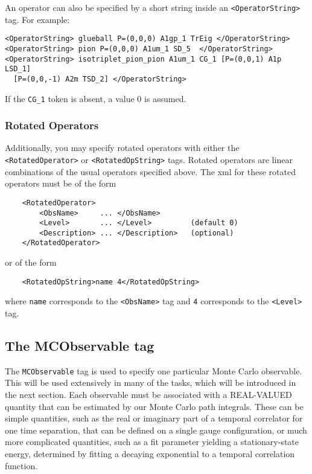 \documentclass[12pt]{article}
\newcommand{\vb}{\texttt}
\begin{document}
An operator can also be specified by a short string inside an 
\vb{<OperatorString>} tag.  For example:                                                       
\begin{verbatim}
<OperatorString> glueball P=(0,0,0) A1gp_1 TrEig </OperatorString>                        
<OperatorString> pion P=(0,0,0) A1um_1 SD_5  </OperatorString>                            
<OperatorString> isotriplet_pion_pion A1um_1 CG_1 [P=(0,0,1) A1p LSD_1] 
  [P=(0,0,-1) A2m TSD_2] </OperatorString>   
\end{verbatim}                                                              
If the \vb{CG\_1} token is absent, a value 0 is assumed.          

\subsubsection{Rotated Operators}

Additionally, you may specify rotated operators with either
the \vb{<RotatedOperator>} or \vb{<RotatedOpString>} tags.
Rotated operators are linear combinations of the usual operators
specified above. The xml for these rotated operators must be
of the form
\begin{verbatim}
    <RotatedOperator>
        <ObsName>     ... </ObsName>
        <Level>       ... </Level>         (default 0)
        <Description> ... </Description>   (optional)
    </RotatedOperator>
\end{verbatim}
or of the form
\begin{verbatim}
    <RotatedOpString>name 4</RotatedOpString>
\end{verbatim}
where \vb{name} corresponds to the \vb{<ObsName>} tag and
\vb{4} corresponds to the \vb{<Level>} tag.

\subsection{The MCObservable tag}

The \vb{MCObservable} tag is used to specify one particular
Monte Carlo observable. This will be used extensively in many
of the tasks, which will be introduced in the next section.
Each observable must be associated with a REAL-VALUED quantity that can be
estimated by our Monte Carlo path integrals. These can be
simple quantities, such as the real or imaginary part of
a temporal correlator for one time separation, that can be
defined on a single gauge configuration, or much more
complicated quantities, such as a fit parameter yielding a
stationary-state energy, determined by fitting a decaying
exponential to a temporal correlation function.
\end{document}
